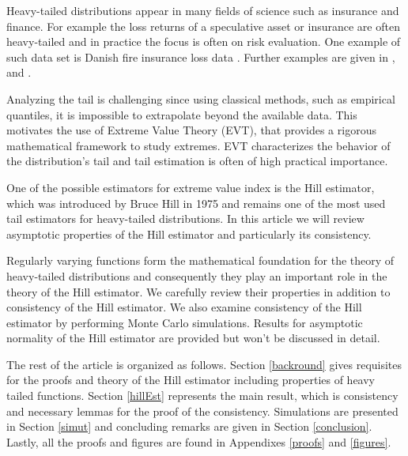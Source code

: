 \documentclass[english,12pt,a4paper,pdftex,sci,utf8]{aaltothesis} %
\newtheorem{definition}[theorem]{Definition}
\begin{document}
Heavy-tailed distributions appear in many fields of science such as insurance and finance. For example the loss returns of a speculative asset or insurance are often heavy-tailed and in practice the focus is often on risk evaluation. One example of such data set is Danish fire insurance loss data \cite{mcneil}  \cite{resnickFire}. Further examples are given in \cite{resnick}, \cite{deHaan} and \cite{embrechts}.

Analyzing the tail is challenging since using classical methods, such as empirical quantiles, it is impossible to extrapolate beyond the available data. This motivates the use of Extreme Value Theory (EVT), that provides a rigorous mathematical framework to study extremes. EVT characterizes the behavior of the distribution's tail and tail estimation is often of high practical importance.

One of the possible estimators for extreme value index is the Hill estimator, which was introduced by Bruce Hill in 1975 \cite{hill} and remains one of the most used tail estimators for heavy-tailed distributions.
In this article we will review asymptotic properties of the Hill estimator and particularly its consistency.

Regularly varying functions form the mathematical foundation for the theory of heavy-tailed distributions and consequently they play an important role in the theory of the Hill estimator. We carefully review their properties in addition to consistency of the Hill estimator. We also examine consistency of the Hill estimator by performing Monte Carlo simulations. Results for asymptotic normality of the Hill estimator are provided but won’t be discussed in detail.

The rest of the article is organized as follows. Section \ref{backround} gives requisites for the proofs and theory of the Hill estimator including properties of heavy tailed functions. Section \ref{hillEst} represents the main result, which is consistency and necessary lemmas for the proof of the consistency. Simulations are presented in Section \ref{simut} and concluding remarks are given in Section \ref{conclusion}. Lastly, all the proofs and figures are found in Appendixes \ref{proofs} and \ref{figures}.

\end{document}
